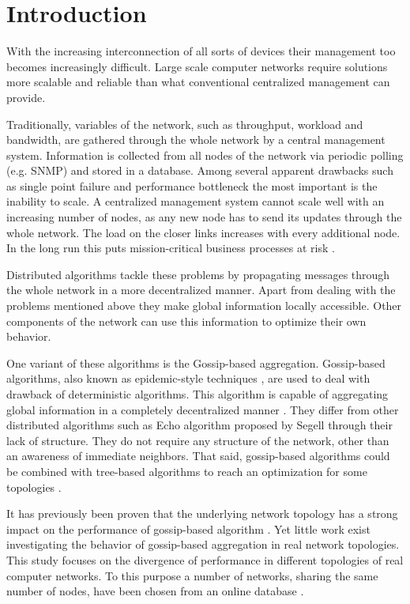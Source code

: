 \section{Introduction}
\label{sec:theory}
With the increasing interconnection of all sorts of devices their management too becomes increasingly difficult. Large scale computer networks require solutions more scalable and reliable than what conventional centralized management can provide.

Traditionally, variables of the network, such as throughput, workload and bandwidth, are gathered through the whole network by a central management system. Information is collected from all nodes of the network via periodic polling (e.g. SNMP) and stored in a database. Among several apparent drawbacks such as single point failure and performance bottleneck the most important is the inability to scale. A centralized management system cannot scale well with an increasing number of nodes, as any new node has to send its updates through the whole network. The load on the closer links increases with every additional node. In the long run this puts mission-critical business processes at risk \cite{Stadler529980}.

Distributed algorithms tackle these problems by propagating messages through the whole network in a more decentralized manner. Apart from dealing with the problems mentioned above they make global information locally accessible. Other components of the network can use this information to optimize their own behavior\cite{jelasity_gossip-based_2005}.

One variant of these algorithms is the Gossip-based aggregation. Gossip-based algorithms, also known as epidemic-style techniques \cite{I.Gupta2006}, are used to deal with drawback of deterministic algorithms. This algorithm is capable of aggregating global information in a completely decentralized manner \cite{jelasity_gossip-based_2005}. They differ from other distributed algorithms such as Echo algorithm proposed by Segell \cite{SegallG89} through their lack of structure. They do not require any structure of the network, other than an awareness of immediate neighbors. That said, gossip-based algorithms could be combined with tree-based algorithms to reach an optimization for some topologies \cite{KyasanurCG06}.

It has previously been proven that the underlying network topology has a strong impact on the performance of gossip-based algorithm \cite{5929538, jelasity_gossip-based_2003}. Yet little work exist investigating the behavior of gossip-based aggregation in real network topologies. This study focuses on the divergence of performance in different topologies of real computer networks. To this purpose a number of networks, sharing the same number of nodes, have been chosen from an online database \cite{knight_internet_2011}.

